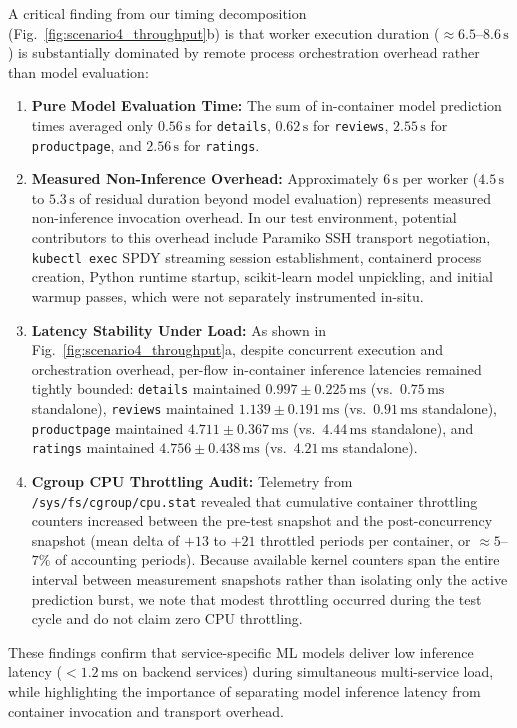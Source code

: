 A critical finding from our timing decomposition (Fig.~\ref{fig:scenario4_throughput}b) is that worker execution duration ($\approx 6.5$--$8.6\,\text{s}$) is substantially dominated by remote process orchestration overhead rather than model evaluation:
\begin{enumerate}
    \item \textbf{Pure Model Evaluation Time:} The sum of in-container model prediction times averaged only $0.56\,\text{s}$ for \texttt{details}, $0.62\,\text{s}$ for \texttt{reviews}, $2.55\,\text{s}$ for \texttt{productpage}, and $2.56\,\text{s}$ for \texttt{ratings}.
    \item \textbf{Measured Non-Inference Overhead:} Approximately $6\,\text{s}$ per worker ($4.5\,\text{s}$ to $5.3\,\text{s}$ of residual duration beyond model evaluation) represents measured non-inference invocation overhead. In our test environment, potential contributors to this overhead include Paramiko SSH transport negotiation, \texttt{kubectl exec} SPDY streaming session establishment, containerd process creation, Python runtime startup, scikit-learn model unpickling, and initial warmup passes, which were not separately instrumented in-situ.
    \item \textbf{Latency Stability Under Load:} As shown in Fig.~\ref{fig:scenario4_throughput}a, despite concurrent execution and orchestration overhead, per-flow in-container inference latencies remained tightly bounded: \texttt{details} maintained $0.997 \pm 0.225\,\text{ms}$ (vs.\ $0.75\,\text{ms}$ standalone), \texttt{reviews} maintained $1.139 \pm 0.191\,\text{ms}$ (vs.\ $0.91\,\text{ms}$ standalone), \texttt{productpage} maintained $4.711 \pm 0.367\,\text{ms}$ (vs.\ $4.44\,\text{ms}$ standalone), and \texttt{ratings} maintained $4.756 \pm 0.438\,\text{ms}$ (vs.\ $4.21\,\text{ms}$ standalone).
    \item \textbf{Cgroup CPU Throttling Audit:} Telemetry from \texttt{/sys/fs/cgroup/cpu.stat} revealed that cumulative container throttling counters increased between the pre-test snapshot and the post-concurrency snapshot (mean delta of $+13$ to $+21$ throttled periods per container, or $\approx 5$--$7\%$ of accounting periods). Because available kernel counters span the entire interval between measurement snapshots rather than isolating only the active prediction burst, we note that modest throttling occurred during the test cycle and do not claim zero CPU throttling.
\end{enumerate}

These findings confirm that service-specific ML models deliver low inference latency ($< 1.2\,\text{ms}$ on backend services) during simultaneous multi-service load, while highlighting the importance of separating model inference latency from container invocation and transport overhead.
